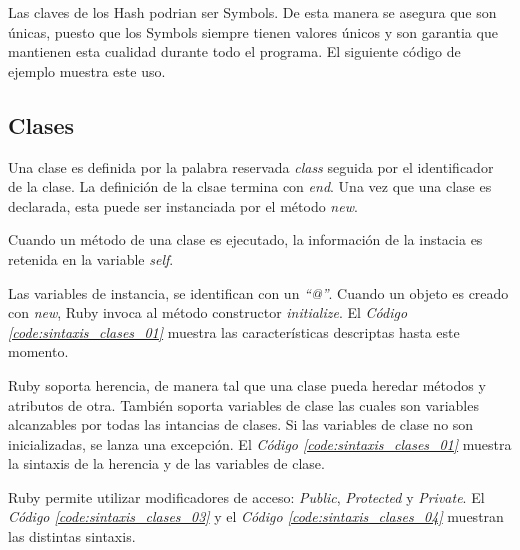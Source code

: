 \documentclass{article}
\newcommand{\refcode}[1]{\textit{Código \ref{#1}}}
\begin{document}
 
\bigskip

Las claves de los Hash podrian ser Symbols. De esta manera se asegura que son únicas, puesto que los Symbols siempre tienen valores únicos y son garantia que mantienen esta cualidad durante todo el programa. El siguiente código de ejemplo muestra este uso.

 
\bigskip



\subsection{Clases}

	Una clase es definida por la palabra reservada \textit{class} seguida por el identificador de la clase. La definición de la clsae termina con \textit{end}.
Una vez que una clase es declarada, esta puede ser instanciada por el método \textit{new}.
	\par
	Cuando un método de una clase es ejecutado, la información de la instacia es retenida en la variable \textit{self}.
	\par
	Las variables de instancia, se identifican con un \textit{``@''}. Cuando un objeto es creado con \textit{new}, Ruby invoca al método constructor \textit{initialize}. El \refcode{code:sintaxis_clases_01} muestra las características descriptas hasta este momento.

 
\bigskip

Ruby soporta herencia, de manera tal que una clase pueda heredar métodos y atributos de otra. También soporta variables de clase las cuales son variables alcanzables por todas las intancias de clases. Si las variables de clase no son inicializadas, se lanza una excepción.  El \refcode{code:sintaxis_clases_01} muestra la sintaxis de la herencia y de las variables de clase. 

 
\bigskip

Ruby permite utilizar modificadores de acceso: \textit{Public}, \textit{Protected} y \textit{Private}. El \refcode{code:sintaxis_clases_03} y el \refcode{code:sintaxis_clases_04} muestran las distintas sintaxis.
\end{document}
